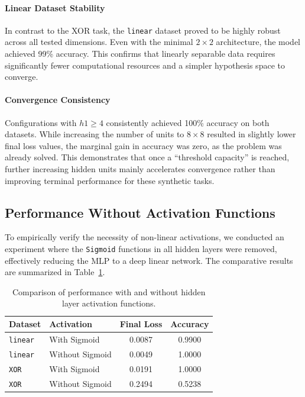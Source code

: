 \documentclass[10pt,twocolumn,letterpaper]{article}
\begin{document}
\paragraph{Linear Dataset Stability} 
In contrast to the XOR task, the \texttt{linear} dataset proved to be highly robust across all tested dimensions. Even with the minimal $2 \times 2$ architecture, the model achieved 99\% accuracy. This confirms that linearly separable data requires significantly fewer computational resources and a simpler hypothesis space to converge.

\paragraph{Convergence Consistency} 
Configurations with $h1 \ge 4$ consistently achieved 100\% accuracy on both datasets. While increasing the number of units to $8 \times 8$ resulted in slightly lower final loss values, the marginal gain in accuracy was zero, as the problem was already solved. This demonstrates that once a ``threshold capacity'' is reached, further increasing hidden units mainly accelerates convergence rather than improving terminal performance for these synthetic tasks.

\subsection{Performance Without Activation Functions}
To empirically verify the necessity of non-linear activations, we conducted an experiment where the \texttt{Sigmoid} functions in all hidden layers were removed, effectively reducing the MLP to a deep linear network. The comparative results are summarized in Table~\ref{tab:no_activation}.

\begin{table}[h]
\centering
\small
\begin{tabular}{llcc}
\toprule
\textbf{Dataset} & \textbf{Activation} & \textbf{Final Loss} & \textbf{Accuracy} \\ \midrule
\texttt{linear} & With Sigmoid & 0.0087 & 0.9900 \\
\texttt{linear} & Without Sigmoid & 0.0049 & 1.0000 \\ \midrule
\texttt{XOR} & With Sigmoid & 0.0191 & 1.0000 \\
\texttt{XOR} & Without Sigmoid & 0.2494 & 0.5238 \\ \bottomrule
\end{tabular}
\caption{Comparison of performance with and without hidden layer activation functions.}
\label{tab:no_activation}
\end{table}
\end{document}
